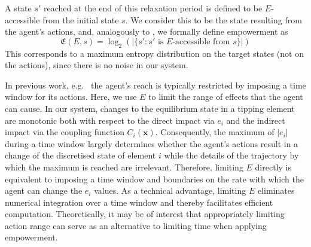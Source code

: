 \documentclass[conference]{IEEEtran}
\newcommand{\vectorsym}[1]{\ensuremath{\mathbf{#1}}}
\newcommand{\agentimpact}{\ensuremath{e}}
\newcommand{\empowerment}{\ensuremath{\mathfrak{E}}}
\newcommand{\couplingfunction}{\ensuremath{C}}
\newcommand{\impactstrength}{\ensuremath{E}}
\begin{document}
A state $s'$ reached at the end of this relaxation period is defined
to be $\impactstrength$-accessible from the initial state $s$. We
consider this to be the state resulting from the agent's actions, and,
analogously to \cite[eq.~(2)]{Kim2009_sustainability}, we formally define
empowerment as
\begin{equation}
  \label{eq_empowerment}
  \empowerment(\impactstrength, s) =
  \log_2(|\{s': s' \mbox{ is } \impactstrength\mbox{-accessible from } s\}|)
\end{equation}
This corresponds to a maximum entropy distribution on the target
states (not on the actions), since there is no noise in our system.

In previous work, e.g.\ \cite{Salge2014_empowermentintro} the agent's
reach is typically restricted by imposing a time window for its
actions. Here, we use $\impactstrength$ to limit the range of effects
that the agent can cause. In our system, changes to the equilibrium
state in a tipping element are monotonic both with respect to the
direct impact via $\agentimpact_i$ and the indirect impact via the
coupling function $\couplingfunction_i(\vectorsym{x})$. Consequently,
the maximum of $|\agentimpact_i|$ during a time window largely
determines whether the agent's actions result in a change of the
discretised state of element $i$ while the details of the trajectory
by which the maximum is reached are irrelevant. Therefore, limiting
$\impactstrength$ directly is equivalent to imposing a time window and
boundaries on the rate with which the agent can change the
$\agentimpact_i$ values. As a technical advantage, limiting
$\impactstrength$ eliminates numerical integration over a time window
and thereby facilitates efficient computation. Theoretically, it may
be of interest that appropriately limiting action range can serve as
an alternative to limiting time when applying empowerment.




\end{document}
